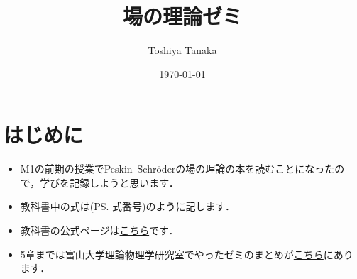 \documentclass[english, dvipdfmx, a4paper]{jsarticle}
\title{場の理論ゼミ}
\author{Toshiya Tanaka}
\date{\today}
\theoremstyle{break}
\numberwithin{equation}{section}
\newcommand{\textref}[1]{(PS. #1)}
\begin{document}
	\maketitle
	\section*{はじめに}
	\begin{itemize}
		\item M1の前期の授業でPeskin--Schr\"{o}derの場の理論の本\cite{Peskin1995}を読むことになったので，学びを記録しようと思います．
		\item 教科書中の式は\textref{式番号}のように記します．
		\item 教科書の公式ページは\href{https://physics.weber.edu/schroeder/qftbook.html}{こちら}です．
		\item 5章までは富山大学理論物理学研究室でやったゼミのまとめが\href{https://toshitnk.github.io/hp/seminars/Peskin.html}{こちら}にあります．
	\end{itemize}

	\setcounter{section}{5}
	
	
	
\end{document}
